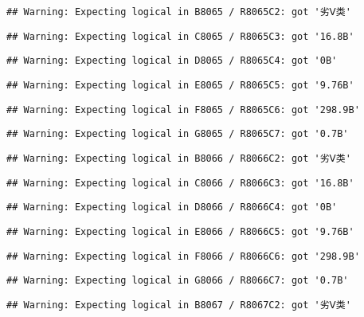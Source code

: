 \documentclass[
]{article}
\begin{document}
\begin{verbatim}
## Warning: Expecting logical in B8065 / R8065C2: got '劣Ⅴ类'
\end{verbatim}

\begin{verbatim}
## Warning: Expecting logical in C8065 / R8065C3: got '16.8B'
\end{verbatim}

\begin{verbatim}
## Warning: Expecting logical in D8065 / R8065C4: got '0B'
\end{verbatim}

\begin{verbatim}
## Warning: Expecting logical in E8065 / R8065C5: got '9.76B'
\end{verbatim}

\begin{verbatim}
## Warning: Expecting logical in F8065 / R8065C6: got '298.9B'
\end{verbatim}

\begin{verbatim}
## Warning: Expecting logical in G8065 / R8065C7: got '0.7B'
\end{verbatim}

\begin{verbatim}
## Warning: Expecting logical in B8066 / R8066C2: got '劣Ⅴ类'
\end{verbatim}

\begin{verbatim}
## Warning: Expecting logical in C8066 / R8066C3: got '16.8B'
\end{verbatim}

\begin{verbatim}
## Warning: Expecting logical in D8066 / R8066C4: got '0B'
\end{verbatim}

\begin{verbatim}
## Warning: Expecting logical in E8066 / R8066C5: got '9.76B'
\end{verbatim}

\begin{verbatim}
## Warning: Expecting logical in F8066 / R8066C6: got '298.9B'
\end{verbatim}

\begin{verbatim}
## Warning: Expecting logical in G8066 / R8066C7: got '0.7B'
\end{verbatim}

\begin{verbatim}
## Warning: Expecting logical in B8067 / R8067C2: got '劣Ⅴ类'
\end{verbatim}
\end{document}
